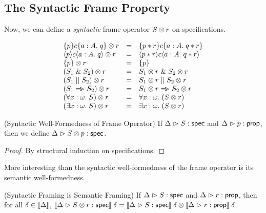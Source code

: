 \subsection{The Syntactic Frame Property}

Now, we can define a \emph{syntactic} frame operator ${S} \otimes {r}$
on specifications. 

\begin{displaymath}
  \begin{array}{lcl}
    {\{{p}\}{c}\{{a:A}.\;{q}\}} \otimes {r}    & = & \{{p * r}\}{c}\{{a:A}.\;{q * r}\} \\
    {\langle{p}\rangle{c}\langle{a:A}.\;{q}\rangle} \otimes {r}   & = & \langle{p * r}\rangle{c}\langle{a:A}.\;{q * r}\rangle \\
    {\{{p}\}} \otimes {r}              & = & \{{p}\} \\
    {(S_1 \;\&\; S_2)} \otimes {r}      & = & {S_1} \otimes {r} \;\&\; {S_2} \otimes {r} \\
    {(S_1 \;||\; S_2)} \otimes {r}       & = & {S_1} \otimes {r} \;||\; {S_2} \otimes {r} \\
    {(S_1 \Rightarrow\!\!\!> S_2)} \otimes {r}      & = & {S_1} \otimes {r} \Rightarrow\!\!\!> {S_2} \otimes {r} \\
    {(\forall x:\omega.\; S)} \otimes {r} & = & \forall x:\omega.\; ({S} \otimes {r}) \\
    {(\exists x:\omega.\; S)} \otimes {r} & = & \exists x:\omega.\; ({S} \otimes {r}) \\
  \end{array}
\end{displaymath}

\begin{prop}{(Syntactic Well-Formedness of Frame Operator)}
If ${\Delta} \vartriangleright {S} : \mathsf{spec}$ and ${\Delta} \vartriangleright {p} : {\mathsf{prop}}$, then
we define ${\Delta} \vartriangleright {{S} \otimes {p}} : \mathsf{spec}$.  
\end{prop}
\begin{proof}
  By structural induction on specifications.
\end{proof}

More interesting than the syntactic well-formedness of the frame
operator is its semantic well-formedness. 

\begin{lemma}{(Syntactic Framing is Semantic Framing)}
If ${\Delta} \vartriangleright {S} : \mathsf{spec}$ and ${\Delta} \vartriangleright {r} : {\mathsf{prop}}$, then for all $\delta \in [\![{\Delta}]\!]$, 
$[\![{{\Delta} \vartriangleright {{S} \otimes {r}} : \mathsf{spec}}]\!]\;\delta = 
{[\![{{\Delta} \vartriangleright {S} : \mathsf{spec}}]\!]\;\delta} \otimes {[\![{{\Delta} \vartriangleright {r} : {\mathsf{prop}}}]\!]\;\delta}$ \\
\end{lemma}

